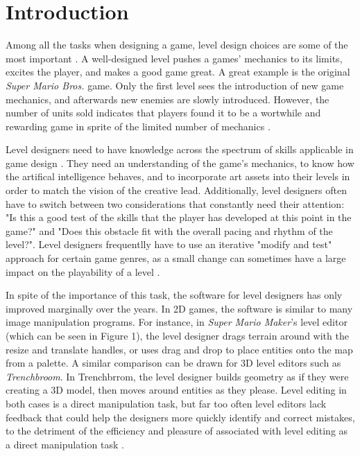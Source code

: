 \section{Introduction}

Among all the tasks when designing a game, level design choices are some of the
most important \cite{blezinski2000, smith2008}. A well-designed level pushes a games' mechanics to its limits,
excites the player, and makes a good game great. A great example is the original
\emph{Super Mario Bros.} game. Only the first level sees the introduction of new
game mechanics, and afterwards new enemies are slowly introduced. However, the
number of units sold indicates that players found it to be a wortwhile and
rewarding game in sprite of the limited number of mechanics \cite{shaker2011}.

Level designers need to have knowledge across the spectrum of skills applicable
in game design \cite{blezinski2000}. They need an understanding of the game's mechanics, to know how
the artifical intelligence behaves, and to incorporate art assets into their 
levels in order to match the vision of the creative lead. Additionally, level
designers often have to switch between two considerations that constantly need
their attention: "Is this a good test of the skills that the player has
developed at this point in the game?" and "Does this obstacle fit with the
overall pacing and rhythm of the level?". Level designers frequentlly have to
use an iterative "modify and test" approach for certain game genres, as a small
change can sometimes have a large impact on the playability of a level \cite{smith2010}.

In spite of the importance of this task, the software for level designers has only
improved marginally over the years. In 2D games, the software is similar to many image
manipulation programs. For instance, in \emph{Super Mario Maker}'s level editor (which
can be seen in Figure 1), the level designer drags terrain around with the resize and
translate handles, or uses drag and drop to place entities onto the map from a palette.
A similar comparison can be drawn for 3D level editors such as \emph{Trenchbroom}. In
Trenchbrrom, the level designer builds geometry as if they were creating a 3D model, then
moves around entities as they please. Level editing in both cases is a direct manipulation
task, but far too often level editors lack feedback that could help the designers more
quickly identify and correct mistakes, to the detriment of the efficiency and pleasure of
associated with level editing as a direct manipulation task \cite{schneiderman1983}.